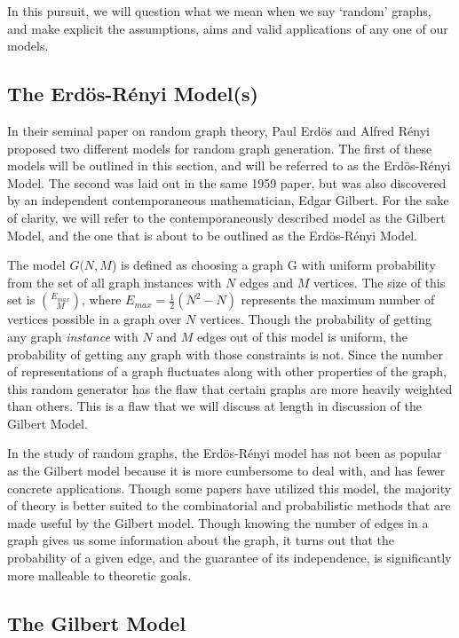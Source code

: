 In this pursuit, we will question what we mean when we say `random' graphs, and make explicit the assumptions, aims and valid applications of any one of our models. 

\subsection{The Erd\"os-R\'enyi Model(s)}

In their seminal paper on random graph theory, Paul Erd\"os and Alfred R\'enyi proposed two different models for random graph generation.
The first of these models will be outlined in this section, and will be referred to as the Erd\"os-R\'enyi Model.
The second was laid out in the same 1959 paper, but was also discovered by an independent contemporaneous mathematician, Edgar Gilbert.
For the sake of clarity, we will refer to the contemporaneously described model as the Gilbert Model, and the one that is about to be outlined as the Erd\"os-R\'enyi Model.

The model $G(N, M$) is defined as choosing a graph G with uniform probability from the set of all graph instances with $N$ edges and $M$ vertices.
The size of this set is $\binom{E_{max}}{M}$, where $E_{max} = \frac{1}{2}(N^2 - N)$ represents the maximum number of vertices possible in a graph over $N$ vertices.
Though the probability of getting any graph \emph{instance} with $N$ and $M$ edges out of this model is uniform, the probability of getting any graph with those constraints is not.
Since the number of representations of a graph fluctuates along with other properties of the graph, this random generator has the flaw that certain graphs are more heavily weighted than others.
This is a flaw that we will discuss at length in discussion of the Gilbert Model.

In the study of random graphs, the Erd\"os-R\'enyi model has not been as popular as the Gilbert model because it is more cumbersome to deal with, and has fewer concrete applications.
Though some papers have utilized this model, the majority of theory is better suited to the combinatorial and probabilistic methods that are made useful by the Gilbert model.
Though knowing the number of edges in a graph gives us some information about the graph, it turns out that the probability of a given edge, and the guarantee of its independence, is significantly more malleable to theoretic goals.

\subsection{The Gilbert Model}

